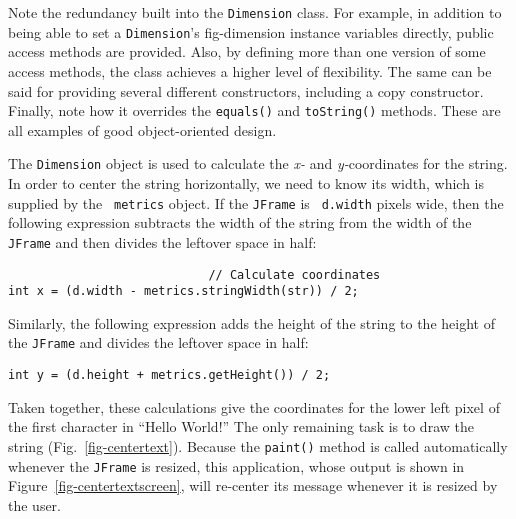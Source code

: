\noindent Note the redundancy built into the {\tt Dimension} class.  
For example, in addition to being able to set a {\tt Dimension}'s
{fig-dimension}
instance variables directly, public access methods are provided.
Also, by defining more than one version of some access methods, the
class achieves a higher level of flexibility.  The same can be said
for providing several different constructors, including a copy
constructor.  Finally, note how it overrides the {\tt equals()} and
{\tt toString()} methods.  These are all examples of good
object-oriented design.


The {\tt Dimension} object is used to calculate the {\it x-} and {\it
y-}coordinates for the string. In order to center the string
horizontally, we need to know its width, which is supplied by the {\tt
metrics} object.  If the {\tt JFrame} is {\tt
d.width} pixels wide, then the following expression subtracts the
width of the string from the width of the {\tt JFrame} and then divides the
leftover space in half:

\begin{jjjlisting}
\begin{lstlisting}
                            // Calculate coordinates
int x = (d.width - metrics.stringWidth(str)) / 2; 
\end{lstlisting}
\end{jjjlisting}

\noindent Similarly, the following expression adds the height
of the string to the height of the {\tt JFrame} and divides the leftover
space in half:

\begin{jjjlisting}
\begin{lstlisting}
int y = (d.height + metrics.getHeight()) / 2;
\end{lstlisting}
\end{jjjlisting}

\noindent Taken together, these calculations give the coordinates for the
lower left pixel of the first character in ``Hello World!''  The only
remaining task is to draw the string (Fig.~\ref{fig-centertext}).
Because the {\tt paint()} method is called automatically whenever
the {\tt JFrame} is resized, this application, whose output is shown in
Figure~\ref{fig-centertextscreen}, will re-center its message whenever
it is resized by the user.

